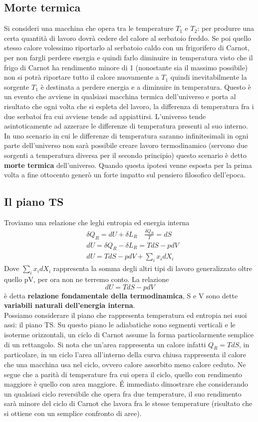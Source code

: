 \documentclass[10pt,a4paper]{article}
\begin{document}
\subsection{Morte termica}
Si consideri una macchina che opera tra le temperature \(T_1\) e \(T_2\): per produrre una certa quantità di lavoro dovrà cedere del calore al serbatoio freddo. Se poi quello stesso calore volessimo riportarlo al serbatoio caldo con un frigorifero di Carnot, per non fargli perdere energia e quindi farlo diminuire in temperatura visto che il frigo di Carnot ha rendimento minore di 1 (nonostante sia il massimo possibile) non si potrà riportare tutto il calore nuovamente a \(T_1\) quindi inevitabilmente la sorgente \(T_1\) è destinata a perdere energia e a diminuire in temperatura. Questo è un evento che avviene in qualsiasi macchina termica dell'universo e porta al risultato che ogni volta che si espleta del lavoro, la differenza di temperatura fra i due serbatoi fra cui avviene tende ad appiattirsi. L'universo tende asintoticamente ad azzerare le differenze di temperatura presenti al suo interno. In uno scenario in cui le differenze di temperatura saranno infinitesimali in ogni parte dell'universo non sarà possibile creare lavoro termodinamico (servono due sorgenti a temperatura diversa per il secondo principio) questo scenario è detto \textbf{morte termica} dell'universo. Quando questa ipotesi venne esposta per la prima volta a fine ottocento generò un forte impatto sul pensiero filosofico dell'epoca. 
\subsection{Il piano TS}
Troviamo una relazione che leghi entropia ed energia interna
\begin{align*}
	&\delta Q_R = dU + \delta L_R \quad \frac{\delta Q_R}{T}=dS\\
	&dU = \delta Q_R - \delta L_R = T dS - pdV\\
	&dU = TdS - pdV+\sum_i x_idX_i
\end{align*}
Dove \(\sum_i x_idX_i\) rappresenta la somma degli altri tipi di lavoro generalizzato oltre quello pV, per ora non ne terremo conto. La relazione
\[dU = TdS-pdV\]
è detta \textbf{relazione fondamentale della termodinamica}, S e V sono dette \textbf{variabili naturali dell'energia interna}.\\ Possiamo considerare il piano che rappresenta temperatura ed entropia nei suoi assi: il piano TS. Su questo piano le adiabatiche sono segmenti verticali e le isoterme orizzontali, un ciclo di Carnot assume la forma particolarmente semplice di un rettangolo. Si nota che un'area rappresenta un calore infatti \(Q_R = TdS\), in particolare, in un ciclo l'area all'interno della curva chiusa rappresenta il calore che una macchina usa nel ciclo, ovvero calore assorbito meno calore ceduto. Ne segue che a parità di temperature fra cui opera il ciclo, quello con rendimento maggiore è quello con area maggiore. \'{E} immediato dimostrare che considerando un qualsiasi ciclo reversibile che opera fra due temperature, il suo rendimento sarà minore del ciclo di Carnot che lavora fra le stesse temperature (risultato che si ottiene con un semplice confronto di aree). 
\end{document}
